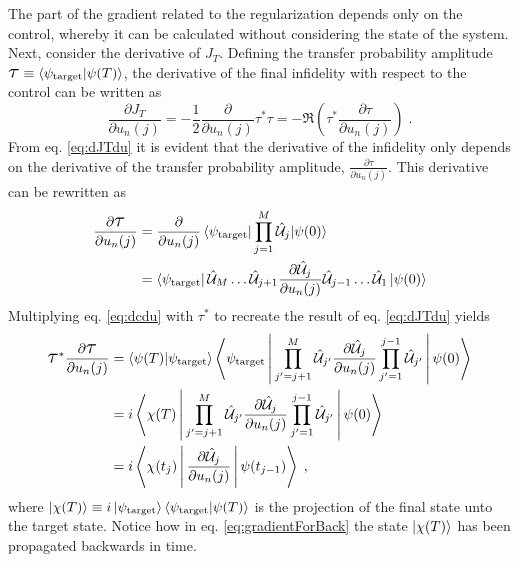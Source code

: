 The part of the gradient related to the regularization depends only on the control, whereby it can be calculated without considering the state of the system.\\ 
Next, consider the derivative of $J_T$. Defining the transfer probability amplitude $\tau \equiv \braket{\psi_{\mathrm{target}} | \psi (T)}$, the derivative of the final infidelity with respect to the control can be written as 
\begin{equation}
	\frac{\partial J_T}{\partial u_n (j)} = - \frac{1}{2} \frac{\partial}{\partial u_n (j)}  \tau^* \tau   = - \Re \left( \tau^* \frac{\partial \tau}{\partial u_n (j)} \right) \; .
	\label{eq:dJTdu}
\end{equation}
From eq. \eqref{eq:dJTdu} it is evident that the derivative of the infidelity only depends on the derivative of the transfer probability amplitude, $\frac{\partial \tau}{\partial u_n (j)}$. This derivative can be rewritten as
\begin{align}
	\frac{\partial \tau}{\partial u_n (j)} &= \frac{\partial }{\partial u_n (j)} \braket{\psi_{\mathrm{target}} | \prod_{j = 1}^{M} \hat{\mathcal{U}}_j | \psi (0)} \nonumber \\
	&= \bra{\psi_{\mathrm{target}}} \hat{\mathcal{U}}_M \ldots \hat{\mathcal{U}}_{j+1} \frac{\partial \hat{\mathcal{U}}_{j}}{\partial u_n (j)} \hat{\mathcal{U}}_{j-1} \ldots \hat{\mathcal{U}}_{1} \ket{\psi (0)}
	\label{eq:dcdu}
\end{align}
Multiplying eq. \eqref{eq:dcdu} with $\tau^*$ to recreate the result of eq. \eqref{eq:dJTdu} yields
\begin{align}
	\tau^* \frac{\partial \tau}{\partial u_n (j)} &=  \braket{\psi(T) | \psi_{\mathrm{target}}} \Braket{\psi_{\mathrm{target}} | \prod_{j' = j +1}^{M} \hat{\mathcal{U}}_{j '} \frac{\partial \hat{\mathcal{U}}_{j}}{\partial u_n (j)} \prod_{j' = 1}^{ j-1} \hat{\mathcal{U}}_{j '} | \psi (0)} \\
	&= i \Braket{\chi (T) | \prod_{j' = j +1}^{M} \hat{\mathcal{U}}_{j '} \frac{\partial \hat{\mathcal{U}}_{j}}{\partial u_n (j)} \prod_{j' = 1}^{ j-1} \hat{\mathcal{U}}_{j '} | \psi (0)} \\
	&= i \Braket{\chi (t_j) |  \frac{\partial \hat{\mathcal{U}}_{j}}{\partial u_n (j)} | \psi (t_{j-1})} \; ,
	\label{eq:gradientForBack}
\end{align}
where $\ket{\chi (T)} \equiv i \ket{\psi_{\mathrm{target}}} \braket{\psi_{\mathrm{target}} | \psi (T)}$ is the projection of the final state unto the target state. Notice how in eq. \eqref{eq:gradientForBack} the state $\ket{\chi (T)}$ has been propagated backwards in time.\\ 
